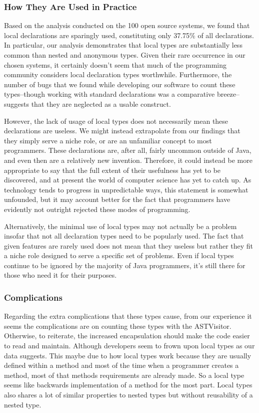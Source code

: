 \documentclass[12p]{article}
\begin{document}
\subsubsection{How They Are Used in Practice}

Based on the analysis conducted on the 100 open source systems, we found that local declarations are sparingly used, constituting only 37.75\% of all declarations. In particular, our analysis demonstrates that local types are substantially less common than nested and anonymous types. Given their rare occurrence in our chosen systems, it certainly doesn’t seem that much of the programming community considers local declaration types worthwhile. Furthermore, the number of bugs that we found while developing our software to count these types--though working with standard declarations was a comparative breeze--suggests that they are neglected as a usable construct.

However, the lack of usage of local types does not necessarily mean these declarations are useless. We might instead extrapolate from our findings that they simply serve a niche role, or are an unfamiliar concept to most programmers. These declarations are, after all, fairly uncommon outside of Java, and even then are a relatively new invention. Therefore, it could instead be more appropriate to say that the full extent of their usefulness has yet to be discovered, and at present the world of computer science has yet to catch up. As technology tends to progress in unpredictable ways, this statement is somewhat unfounded, but it may account better for the fact that programmers have evidently not outright rejected these modes of programming.

Alternatively, the minimal use of local types may not actually be a problem insofar that not all declaration types need to be popularly used. The fact that given features are rarely used does not mean that they useless but rather they fit a niche role designed to serve a specific set of problems. Even if local types continue to be ignored by the majority of Java programmers, it’s still there for those who need it for their purposes.

\subsubsection{Complications}

Regarding the extra complications that these types cause, from our experience it seems the complications are on counting these types with the ASTVisitor. Otherwise, to reiterate, the increased encapsulation should make the code easier to read and maintain. Although developers seem to frown upon local types as our data suggests. This maybe due to how local types work because they are usually defined within a method and most of the time when a programmer creates a method, most of that methods requirements are already made. So a local type seems like backwards implementation of a method for the most part. Local types also shares a lot of similar properties to nested types but without reusability of a nested type.
\end{document}

